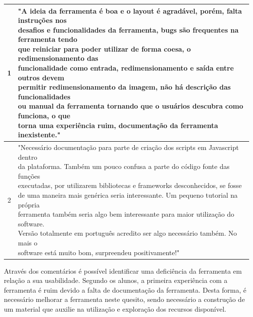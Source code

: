 \documentclass[
	12pt,				%
	oneside,			%
	a4paper,			%
	english,			%
	french,				%
	spanish,			%
	brazil,				%
	]{abntex2}
\begin{document}
\begin{table}[H]
\centering
{} \label{tab:avaliacaoComentarios}
\renewcommand{\arraystretch}{1.8}
\begin{tabular}{|c|l|}
    \hline
    1 &
    \makecell[l]{
"A ideia da ferramenta é boa e o layout é agradável, porém, falta instruções nos \\ desafios e funcionalidades da ferramenta, bugs são frequentes na ferramenta tendo\\ 
que reiniciar para poder utilizar de forma coesa, o redimensionamento das \\
funcionalidade como entrada, redimensionamento e saída entre outros devem \\
permitir redimensionamento da imagem, não há descrição das funcionalidades \\
ou manual da ferramenta tornando que o usuários descubra como funciona, o que \\
torna uma experiência ruim, documentação da ferramenta inexistente."} \\   
    \hline  
    2 &
    \makecell[l]{
"Necessário documentação para parte de criação dos scripts em Javascript dentro \\
da plataforma. Também um pouco confusa a parte do código fonte das funções \\
executadas, por utilizarem bibliotecas e frameworks desconhecidos, se fosse \\
de uma maneira mais genérica seria interessante. Um pequeno tutorial na própria\\ ferramenta também seria algo bem interessante para maior utilização do software.\\ 
Versão totalmente em português acredito ser algo necessário também. No mais o \\
software está muito bom, surpreendeu positivamente!"} \\   
    \hline      
\end{tabular}
\centering
\end{table}

Através dos comentários é possível identificar uma deficiência da ferramenta em relação a sua usabilidade. Segundo os alunos, a primeira experiência com a ferramenta é ruim devido a falta de documentação da ferramenta. Desta forma, é necessário melhorar a ferramenta neste quesito, sendo necessário a construção de um material que auxilie na utilização e exploração dos recursos disponível.
\end{document}
